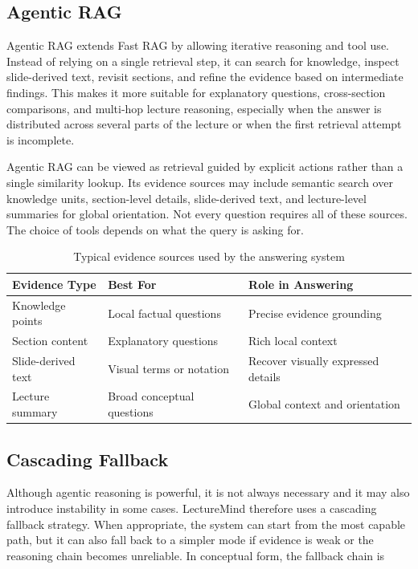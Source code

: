 \subsection{Agentic RAG}

Agentic RAG extends Fast RAG by allowing iterative reasoning and tool use. Instead of relying on a single retrieval step, it can search for knowledge, inspect slide-derived text, revisit sections, and refine the evidence based on intermediate findings. This makes it more suitable for explanatory questions, cross-section comparisons, and multi-hop lecture reasoning, especially when the answer is distributed across several parts of the lecture or when the first retrieval attempt is incomplete.

Agentic RAG can be viewed as retrieval guided by explicit actions rather than a single similarity lookup. Its evidence sources may include semantic search over knowledge units, section-level details, slide-derived text, and lecture-level summaries for global orientation. Not every question requires all of these sources. The choice of tools depends on what the query is asking for.

\begin{table}[H]
    \centering
    \caption{Typical evidence sources used by the answering system}
    \begin{tabular}{@{}lll@{}}
        \toprule
        \textbf{Evidence Type} & \textbf{Best For} & \textbf{Role in Answering} \\ \midrule
        Knowledge points & Local factual questions & Precise evidence grounding \\
        Section content & Explanatory questions & Rich local context \\
        Slide-derived text & Visual terms or notation & Recover visually expressed details \\
        Lecture summary & Broad conceptual questions & Global context and orientation \\ \bottomrule
    \end{tabular}
\end{table}

\subsection{Cascading Fallback}

Although agentic reasoning is powerful, it is not always necessary and it may also introduce instability in some cases. LectureMind therefore uses a cascading fallback strategy. When appropriate, the system can start from the most capable path, but it can also fall back to a simpler mode if evidence is weak or the reasoning chain becomes unreliable. In conceptual form, the fallback chain is


